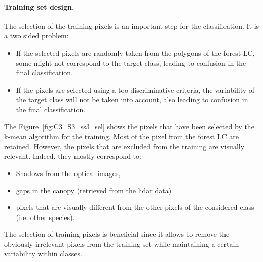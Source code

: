 \paragraph{Training set design. \\}

The selection of the training pixels is an important step for the classification. It is a two sided problem:
\begin{itemize}
\item If the selected pixels are randomly taken from the polygons of the forest LC, some might not correspond to the target class, leading to confusion in the final classification.
\item If the pixels are selected using a too discriminative criteria, the variability of the target class will not be taken into account, also leading to confusion in the final classification.
\end{itemize}

The Figure~\ref{fig:C3_S3_ss3_sel} shows the pixels that have been selected by the k-mean algorithm for the training. Most of the pixel from the forest LC are retained. However, the pixels that are excluded from the training are visually relevant. Indeed, they mostly correspond to:
\begin{itemize}
\item Shadows from the optical images,
\item gaps in the canopy (retrieved from the lidar data)
\item pixels that are visually different from the other pixels of the considered class (i.e. other species).
\end{itemize}

The selection of training pixels is beneficial since it allows to remove the obviously irrelevant pixels from the training set while maintaining a certain variability within classes.

